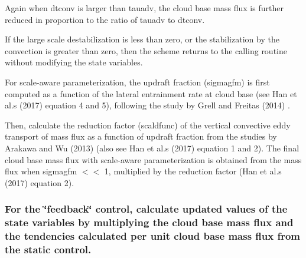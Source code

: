 \begin{DoxyItemize}
Again when dtconv is larger than tauadv, the cloud base mass flux is further reduced in proportion to the ratio of tauadv to dtconv.
\item If the large scale destabilization is less than zero, or the stabilization by the convection is greater than zero, then the scheme returns to the calling routine without modifying the state variables.
\item For scale-\/aware parameterization, the updraft fraction (sigmagfm) is first computed as a function of the lateral entrainment rate at cloud base (see Han et al.\textquotesingle{}s (2017) \cite{han_et_al_2017} equation 4 and 5), following the study by Grell and Freitas (2014) \cite{grell_and_freitus_2014}.
\item Then, calculate the reduction factor (scaldfunc) of the vertical convective eddy transport of mass flux as a function of updraft fraction from the studies by Arakawa and Wu (2013) \cite{arakawa_and_wu_2013} (also see Han et al.\textquotesingle{}s (2017) \cite{han_et_al_2017} equation 1 and 2). The final cloud base mass flux with scale-\/aware parameterization is obtained from the mass flux when sigmagfm $<$$<$ 1, multiplied by the reduction factor (Han et al.\textquotesingle{}s (2017) \cite{han_et_al_2017} equation 2).
\end{DoxyItemize}

\subsubsection*{For the \char`\"{}feedback\char`\"{} control, calculate updated values of the state variables by multiplying the cloud base mass flux and the tendencies calculated per unit cloud base mass flux from the static control.}


